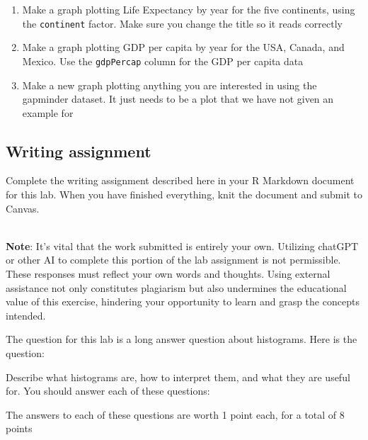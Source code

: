 \documentclass[
]{book}
\begin{document}
\begin{enumerate}
\def\labelenumi{\arabic{enumi}.}
\item
  Make a graph plotting Life Expectancy by year for the five continents, using the \texttt{continent} factor. Make sure you change the title so it reads correctly
\item
  Make a graph plotting GDP per capita by year for the USA, Canada, and Mexico. Use the \texttt{gdpPercap} column for the GDP per capita data
\item
  Make a new graph plotting anything you are interested in using the gapminder dataset. It just needs to be a plot that we have not given an example for
\end{enumerate}

\hypertarget{writing-assignment}{%
\subsection{Writing assignment}\label{writing-assignment}}

Complete the writing assignment described here in your R Markdown document for this lab. When you have finished everything, knit the document and submit to Canvas.\\
\strut \\
\textbf{Note}: It's vital that the work submitted is entirely your own. Utilizing chatGPT or other AI to complete this portion of the lab assignment is not permissible. These responses must reflect your own words and thoughts. Using external assistance not only constitutes plagiarism but also undermines the educational value of this exercise, hindering your opportunity to learn and grasp the concepts intended.

The question for this lab is a long answer question about histograms. Here is the question:

Describe what histograms are, how to interpret them, and what they are useful for. You should answer each of these questions:

The answers to each of these questions are worth 1 point each, for a total of 8 points
\end{document}
